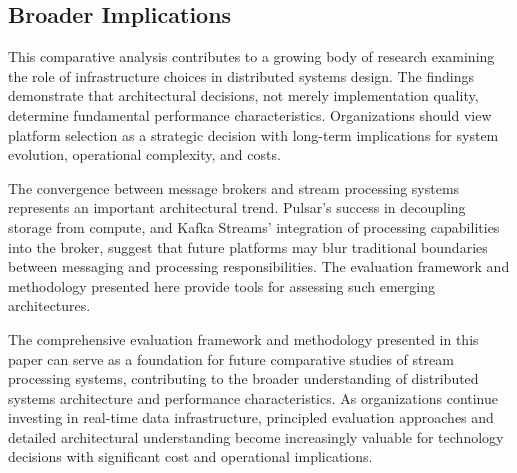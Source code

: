 \documentclass[10pt,twocolumn]{article}
\begin{document}
\subsection{Broader Implications}

This comparative analysis contributes to a growing body of research examining the role of infrastructure choices in distributed systems design. The findings demonstrate that architectural decisions, not merely implementation quality, determine fundamental performance characteristics. Organizations should view platform selection as a strategic decision with long-term implications for system evolution, operational complexity, and costs.

The convergence between message brokers and stream processing systems represents an important architectural trend. Pulsar's success in decoupling storage from compute, and Kafka Streams' integration of processing capabilities into the broker, suggest that future platforms may blur traditional boundaries between messaging and processing responsibilities. The evaluation framework and methodology presented here provide tools for assessing such emerging architectures.

The comprehensive evaluation framework and methodology presented in this paper can serve as a foundation for future comparative studies of stream processing systems, contributing to the broader understanding of distributed systems architecture and performance characteristics. As organizations continue investing in real-time data infrastructure, principled evaluation approaches and detailed architectural understanding become increasingly valuable for technology decisions with significant cost and operational implications.
\end{document}
